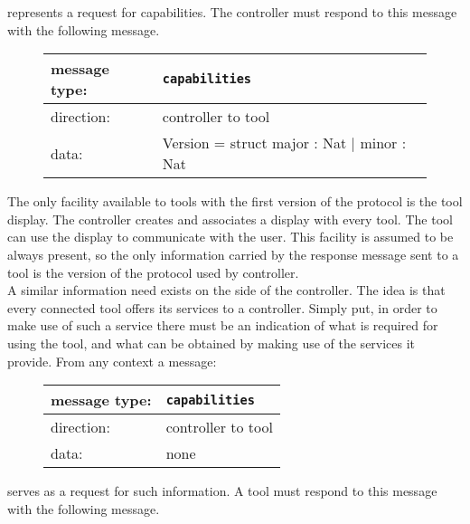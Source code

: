 \documentclass{article}
\newcommand{\msg}[1]{\texttt{#1}}
\begin{document}
   \noindent represents a request for capabilities. The controller must respond
   to this message with the following message.

   \begin{figure}[H]
    \begin{tabular}{|ll|}
     \hline
      message type:   & \msg{capabilities} \\
     \hline
      direction:      & controller to tool \\
      data:           & Version = struct major : Nat $|$ minor : Nat \\
     \hline
    \end{tabular}
   \end{figure}

   The only facility available to tools with the first version of the protocol
   is the tool display. The controller creates and associates a display with
   every tool. The tool can use the display to communicate with the user. This
   facility is assumed to be always present, so the only information carried by
   the response message sent to a tool is the version of the protocol used by
   controller.
   \\[4pt]
   A similar information need exists on the side of the controller. The idea is
   that every connected tool offers its services to a controller.  Simply put,
   in order to make use of such a service there must be an indication of what
   is required for using the tool, and what can be obtained by making use of the
   services it provide. From any
   context a message:
   
   \begin{figure}[H]
    \begin{tabular}{|ll|}
     \hline
      message type:   & \msg{capabilities} \\
     \hline
      direction:      & controller to tool \\
      data:           & none \\
     \hline
    \end{tabular}
   \end{figure}

   \noindent serves as a request for such information. A tool must respond to
   this message with  the following message.
\end{document}
